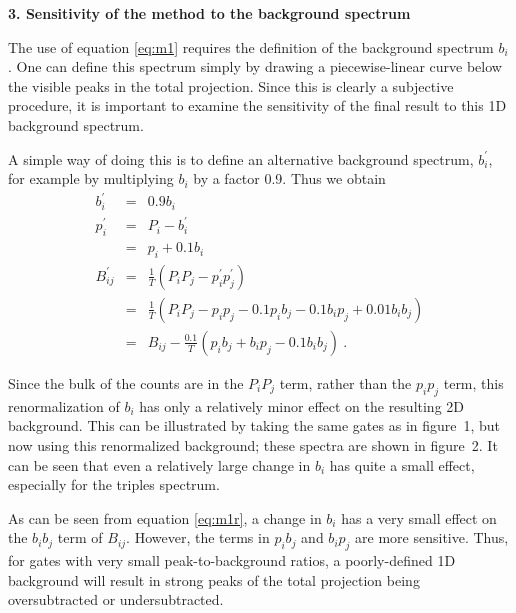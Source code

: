 \begin{center}
{\bf           3. Sensitivity of the method to the background spectrum}
\end{center}

The use of equation \ref{eq:m1} requires the definition of the background
spectrum $b_i$. One can define this spectrum simply by drawing a
piecewise-linear curve below the visible peaks in the total projection. Since
this is clearly a subjective procedure, it is important to examine the
sensitivity of the final result to this 1D background spectrum.

A simple way of doing this is to define an alternative background spectrum,
$b^{\prime}_i$, for example by multiplying $b_i$ by a factor 0.9. Thus we
obtain
\begin{eqnarray}
   b^{\prime}_i & = & 0.9 b_i                                     \nonumber \\
   p^{\prime}_i & = & P_i - b^{\prime}_i                          \nonumber \\
                & = & p_i + 0.1 b_i                               \nonumber \\
B^{\prime}_{ij} & = & \frac {1}{T} (P_i P_j - p^{\prime}_i p^{\prime}_j)
                                                                  \nonumber \\
         & = & \frac {1}{T} (P_i P_j - p_i p_j - 0.1 p_i b_j
                                   - 0.1 b_i p_j + 0.01 b_i b_j)  \nonumber \\
         & = & B_{ij} - \frac {0.1}{T} (p_i b_j + b_i p_j - 0.1 b_i b_j) \ .
                                                            \label{eq:m1r} 
\end{eqnarray}

Since the bulk of the counts are in the $P_i P_j$ term, rather than the $p_i
p_j$ term, this renormalization of $b_i$ has only a relatively minor effect on
the resulting 2D background. This can be illustrated by taking the same gates
as in figure~1, but now using this renormalized background; these spectra are
shown in figure~2. It can be seen that even a relatively large change in $b_i$
has quite a small effect, especially for the triples spectrum.

As can be seen from equation \ref{eq:m1r}, a change in $b_i$ has a very small
effect on the $b_i b_j$ term of $B_{ij}$. However, the terms in $p_i b_j$ and
$b_i p_j$ are more sensitive. Thus, for gates with very small
peak-to-background ratios, a poorly-defined 1D background will result in strong
peaks of the total projection being oversubtracted or undersubtracted.

